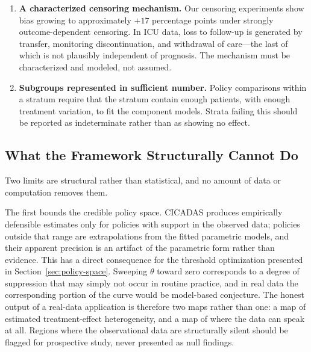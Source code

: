 \begin{enumerate}
\item \textbf{A characterized censoring mechanism.} Our censoring experiments show bias growing to
approximately $+17$ percentage points under strongly outcome-dependent censoring. In ICU data, loss
to follow-up is generated by transfer, monitoring discontinuation, and withdrawal of care---the last
of which is not plausibly independent of prognosis. The mechanism must be characterized and modeled,
not assumed.

\item \textbf{Subgroups represented in sufficient number.} Policy comparisons within a stratum
require that the stratum contain enough patients, with enough treatment variation, to fit the
component models. Strata failing this should be reported as indeterminate rather than as showing no
effect.
\end{enumerate}

\subsection{What the Framework Structurally Cannot Do}
\label{sec:structural-limits}

Two limits are structural rather than statistical, and no amount of data or computation removes
them.

The first bounds the credible policy space. CICADAS produces empirically defensible estimates only
for policies with support in the observed data; policies outside that range are extrapolations from
the fitted parametric models, and their apparent precision is an artifact of the parametric form
rather than evidence. This has a direct consequence for the threshold optimization presented in
Section~\ref{sec:policy-space}. Sweeping $\theta$ toward zero corresponds to a degree of suppression
that may simply not occur in routine practice, and in real data the corresponding portion of the
curve would be model-based conjecture. The honest output of a real-data application is therefore two
maps rather than one: a map of estimated treatment-effect heterogeneity, and a map of where the data
can speak at all. Regions where the observational data are structurally silent should be flagged for
prospective study, never presented as null findings.

